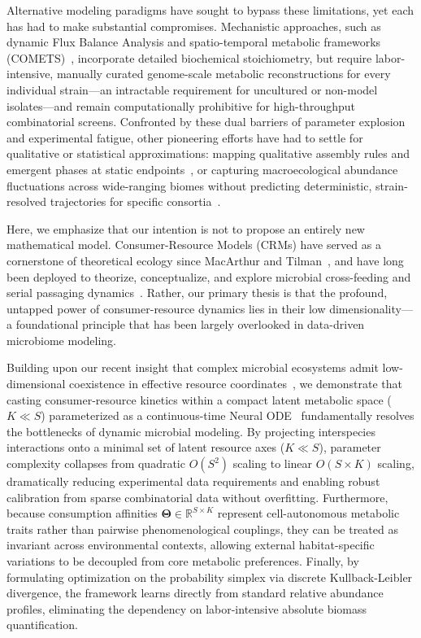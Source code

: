 Alternative modeling paradigms have sought to bypass these limitations, yet each has had to make substantial compromises. Mechanistic approaches, such as dynamic Flux Balance Analysis and spatio-temporal metabolic frameworks (COMETS)~\cite{harcombe2014metabolic}, incorporate detailed biochemical stoichiometry, but require labor-intensive, manually curated genome-scale metabolic reconstructions for every individual strain---an intractable requirement for uncultured or non-model isolates---and remain computationally prohibitive for high-throughput combinatorial screens. Confronted by these dual barriers of parameter explosion and experimental fatigue, other pioneering efforts have had to settle for qualitative or statistical approximations: mapping qualitative assembly rules and emergent phases at static endpoints~\cite{friedman2017community,hu2022emergent}, or capturing macroecological abundance fluctuations across wide-ranging biomes without predicting deterministic, strain-resolved trajectories for specific consortia~\cite{ho2022competition}.

Here, we emphasize that our intention is not to propose an entirely new mathematical model. Consumer-Resource Models (CRMs) have served as a cornerstone of theoretical ecology since MacArthur and Tilman~\cite{macarthur1970species,tilman1982resource}, and have long been deployed to theorize, conceptualize, and explore microbial cross-feeding and serial passaging dynamics~\cite{marsland2019available,goldford2018emergent,liao2020modeling}. Rather, our primary thesis is that the profound, untapped power of consumer-resource dynamics lies in their low dimensionality---a foundational principle that has been largely overlooked in data-driven microbiome modeling. 

Building upon our recent insight that complex microbial ecosystems admit low-dimensional coexistence in effective resource coordinates~\cite{srinivasan2026low}, we demonstrate that casting consumer-resource kinetics within a compact latent metabolic space ($K \ll S$) parameterized as a continuous-time Neural ODE~\cite{chen2018neural} fundamentally resolves the bottlenecks of dynamic microbial modeling. By projecting interspecies interactions onto a minimal set of latent resource axes ($K \ll S$), parameter complexity collapses from quadratic $O(S^2)$ scaling to linear $O(S \times K)$ scaling, dramatically reducing experimental data requirements and enabling robust calibration from sparse combinatorial data without overfitting. Furthermore, because consumption affinities $\mathbf{\Theta} \in \mathbb{R}^{S \times K}$ represent cell-autonomous metabolic traits rather than pairwise phenomenological couplings, they can be treated as invariant across environmental contexts, allowing external habitat-specific variations to be decoupled from core metabolic preferences. Finally, by formulating optimization on the probability simplex via discrete Kullback-Leibler divergence, the framework learns directly from standard relative abundance profiles, eliminating the dependency on labor-intensive absolute biomass quantification.

